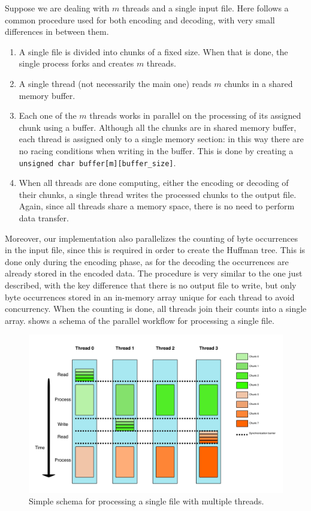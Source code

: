 Suppose we are dealing with \(m\) threads and a single input file. Here follows a common procedure used for both encoding and decoding, with very small differences in between them.
\begin{enumerate}
	\item A single file is divided into chunks of a fixed size. When that is done, the single process forks and creates \(m\) threads.
	\item A single thread (not necessarily the main one) reads \(m\) chunks in a shared memory buffer.
	\item Each one of the \(m\) threads works in parallel on the processing of its assigned chunk using a buffer. Although all the chunks are in shared memory buffer, each thread is assigned only to a single memory section: in this way there are no racing conditions when writing in the buffer. This is done by creating a \verb|unsigned char buffer[m][buffer_size]|. 
	\item When all threads are done computing, either the encoding or decoding of their chunks, a single thread writes the processed chunks to the output file.
	Again, since all threads share a memory space, there is no need to perform data transfer.
\end{enumerate}

Moreover, our implementation also parallelizes the counting of byte occurrences in the input file, since this is required in order to create the Huffman tree. 
This is done only during the encoding phase, as for the decoding the occurrences are already stored in the encoded data. The procedure is very similar to the one just described, with the key difference that there is no output file to write, but only byte occurrences stored in an in-memory array unique for each thread to avoid concurrency. When the counting is done, all threads join their counts into a single array.  shows a schema of the parallel workflow for processing a single file. 

\begin{figure}
	\centering
	\includegraphics[width=0.8\linewidth]{../imgs/threading}
	\caption{Simple schema for processing a single file with multiple threads.}
	\label{fig:threading}
\end{figure}


